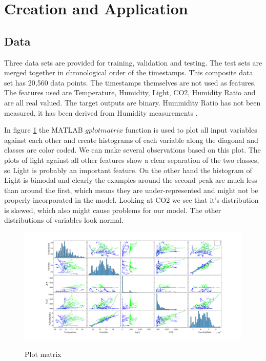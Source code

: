 \documentclass[a4paper, 11pt]{article}
\begin{document}
\section{Creation and Application}

\subsection{Data}
Three data sets are provided for training, validation and testing. The test sets are merged together in chronological order of the timestamps. This composite data set has 20,560 data points. The timestamps themselves are not used as features. The features used are Temperature, Humidity, Light, CO2, Humidity Ratio and are all real valued. The target outputs are binary. Hummidity Ratio has not been measured, it has been derived from Humidity measurements \cite{Candanedo2016}. 

In figure \ref{fig:plotmatrix} the MATLAB $gplotmatrix$ function is used to plot all input variables against each other and create histograms of each variable along the diagonal and classes are color coded. We can make several observations based on this plot. The plots of light against all other features show a clear separation of the two classes, so Light is probably an important feature. On the other hand the histogram of Light is bimodal and clearly the examples around the second peak are much less than around the first, which means they are under-represented and might not be properly incorporated in the model. Looking at CO2 we see that it's distribution is skewed, which also might cause problems for our model. The other distributions of variables look normal. 

\begin{figure}[h]
  \caption{Plot matrix}
  \centering
    \includegraphics[width=1\textwidth]{../figures/plotmatrix.png}
    \label{fig:plotmatrix}
\end{figure}
\end{document}

